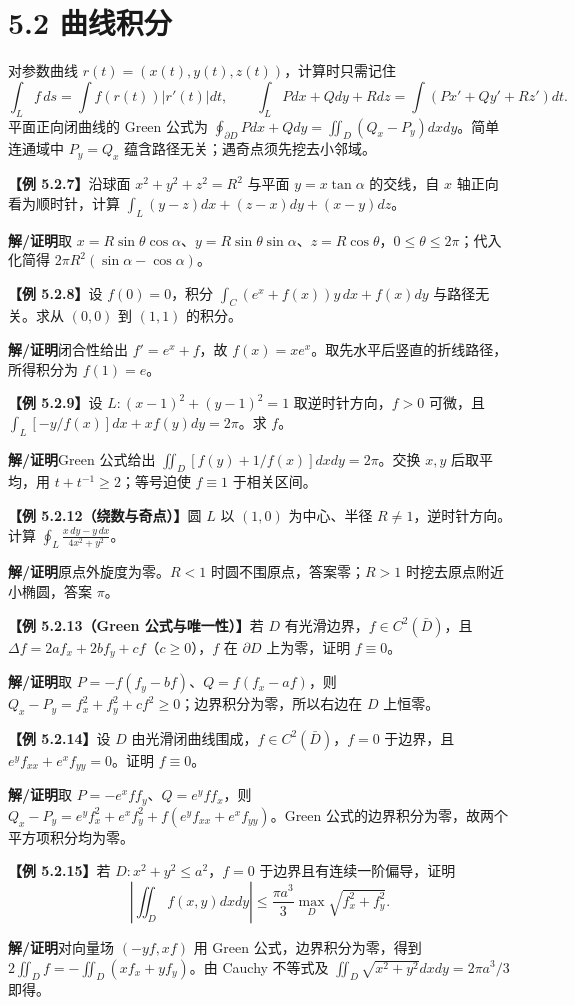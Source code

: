 \documentclass[UTF8,a4paper,11pt]{ctexart}
\newcommand{\ex}[1]{\par\medskip\noindent\textbf{【例 #1】}\;}
\newcommand{\sol}{\par\noindent\textbf{解/证明}\;}
\begin{document}
\section*{5.2 曲线积分}
对参数曲线 $r(t)=(x(t),y(t),z(t))$，计算时只需记住
\[\int_L f\,ds=\int f(r(t))|r'(t)|dt,\qquad \int_LPdx+Qdy+Rdz=\int(Px'+Qy'+Rz')dt.\]
平面正向闭曲线的 Green 公式为 $\oint_{\partial D}Pdx+Qdy=\iint_D(Q_x-P_y)dxdy$。简单连通域中 $P_y=Q_x$ 蕴含路径无关；遇奇点须先挖去小邻域。
\ex{5.2.7}沿球面 $x^2+y^2+z^2=R^2$ 与平面 $y=x\tan\alpha$ 的交线，自 $x$ 轴正向看为顺时针，计算 $\int_L(y-z)dx+(z-x)dy+(x-y)dz$。
\sol 取 $x=R\sin\theta\cos\alpha$、$y=R\sin\theta\sin\alpha$、$z=R\cos\theta$，$0\le\theta\le2\pi$；代入化简得 $2\pi R^2(\sin\alpha-\cos\alpha)$。
\ex{5.2.8}设 $f(0)=0$，积分 $\int_C(e^x+f(x))y\,dx+f(x)dy$ 与路径无关。求从 $(0,0)$ 到 $(1,1)$ 的积分。
\sol 闭合性给出 $f'=e^x+f$，故 $f(x)=xe^x$。取先水平后竖直的折线路径，所得积分为 $f(1)=e$。
\ex{5.2.9}设 $L:(x-1)^2+(y-1)^2=1$ 取逆时针方向，$f>0$ 可微，且 $\int_L[-y/f(x)]dx+xf(y)dy=2\pi$。求 $f$。
\sol Green 公式给出 $\iint_D[f(y)+1/f(x)]dxdy=2\pi$。交换 $x,y$ 后取平均，用 $t+t^{-1}\ge2$；等号迫使 $f\equiv1$ 于相关区间。
\ex{5.2.12（绕数与奇点）}圆 $L$ 以 $(1,0)$ 为中心、半径 $R\ne1$，逆时针方向。计算 $\displaystyle\oint_L\frac{x\,dy-y\,dx}{4x^2+y^2}$。
\sol 原点外旋度为零。$R<1$ 时圆不围原点，答案零；$R>1$ 时挖去原点附近小椭圆，答案 $\pi$。
\ex{5.2.13（Green 公式与唯一性）}若 $D$ 有光滑边界，$f\in C^2(\bar D)$，且 $\Delta f=2af_x+2bf_y+cf$（$c\ge0$），$f$ 在 $\partial D$ 上为零，证明 $f\equiv0$。
\sol 取 $P=-f(f_y-bf)$、$Q=f(f_x-af)$，则 $Q_x-P_y=f_x^2+f_y^2+cf^2\ge0$；边界积分为零，所以右边在 $D$ 上恒零。
\ex{5.2.14}设 $D$ 由光滑闭曲线围成，$f\in C^2(\bar D)$，$f=0$ 于边界，且 $e^yf_{xx}+e^xf_{yy}=0$。证明 $f\equiv0$。
\sol 取 $P=-e^xf f_y$、$Q=e^y f f_x$，则 $Q_x-P_y=e^y f_x^2+e^x f_y^2+f(e^yf_{xx}+e^xf_{yy})$。Green 公式的边界积分为零，故两个平方项积分均为零。
\ex{5.2.15}若 $D:x^2+y^2\le a^2$，$f=0$ 于边界且有连续一阶偏导，证明
\[\left|\iint_Df(x,y)dxdy\right|\le\frac{\pi a^3}{3}\max_D\sqrt{f_x^2+f_y^2}.\]
\sol 对向量场 $(-yf,xf)$ 用 Green 公式，边界积分为零，得到 $2\iint_Df=-\iint_D(xf_x+yf_y)$。由 Cauchy 不等式及 $\iint_D\sqrt{x^2+y^2}dxdy=2\pi a^3/3$ 即得。
\end{document}
